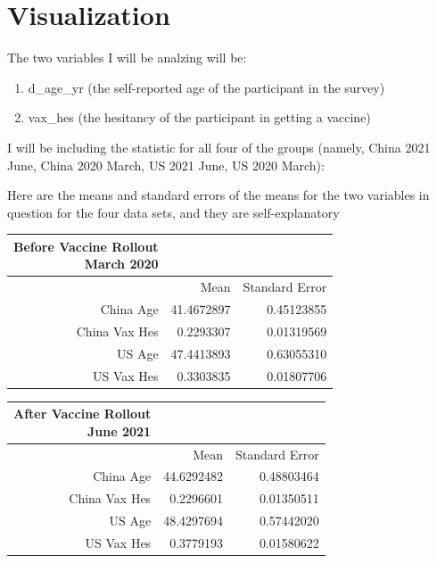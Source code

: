 \documentclass[
]{article}
\providecommand{\tightlist}{%
  \setlength{\itemsep}{0pt}\setlength{\parskip}{0pt}}
\begin{document}
\hypertarget{visualization}{%
\section{Visualization}\label{visualization}}

The two variables I will be analzing will be:

\begin{enumerate}
\def\labelenumi{\arabic{enumi}.}
\tightlist
\item
  d\_age\_yr (the self-reported age of the participant in the survey)
\item
  vax\_hes (the hesitancy of the participant in getting a vaccine)
\end{enumerate}

I will be including the statistic for all four of the groups (namely,
China 2021 June, China 2020 March, US 2021 June, US 2020 March):

Here are the means and standard errors of the means for the two
variables in question for the four data sets, and they are
self-explanatory

\captionsetup[table]{labelformat=empty,skip=1pt}
\begin{longtable}{r|rr}
\caption*{
{\large Before Vaccine Rollout} \\ 
{\small March 2020}
} \\ 
\toprule
\multicolumn{1}{l}{} & Mean & Standard Error \\ 
\midrule
China Age & 41.4672897 & 0.45123855 \\ 
China Vax Hes & 0.2293307 & 0.01319569 \\ 
US Age & 47.4413893 & 0.63055310 \\ 
US Vax Hes & 0.3303835 & 0.01807706 \\ 
\bottomrule
\end{longtable}
\captionsetup[table]{labelformat=empty,skip=1pt}
\begin{longtable}{r|rr}
\caption*{
{\large After Vaccine Rollout} \\ 
{\small June 2021}
} \\ 
\toprule
\multicolumn{1}{l}{} & Mean & Standard Error \\ 
\midrule
China Age & 44.6292482 & 0.48803464 \\ 
China Vax Hes & 0.2296601 & 0.01350511 \\ 
US Age & 48.4297694 & 0.57442020 \\ 
US Vax Hes & 0.3779193 & 0.01580622 \\ 
\bottomrule
\end{longtable}
\end{document}
